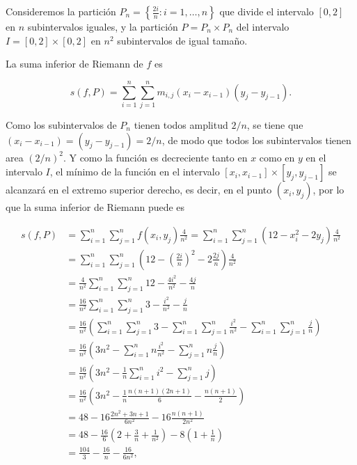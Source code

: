 \documentclass[
  a4paper,
]{scrreport}
\theoremstyle{definition}
\theoremstyle{remark}
\begin{document}
\begin{tcolorbox}[enhanced jigsaw, toprule=.15mm, coltitle=black, colframe=quarto-callout-tip-color-frame, leftrule=.75mm, breakable, left=2mm, opacitybacktitle=0.6, colbacktitle=quarto-callout-tip-color!10!white, bottomrule=.15mm, opacityback=0, title=\textcolor{quarto-callout-tip-color}{\faLightbulb}\hspace{0.5em}{Solución}, bottomtitle=1mm, toptitle=1mm, titlerule=0mm, colback=white, arc=.35mm, rightrule=.15mm]

Consideremos la partición
\(P_n = \left\{\frac{2i}{n}: i=1,\ldots,n\right\}\) que divide el
intervalo \([0,2]\) en \(n\) subintervalos iguales, y la partición
\(P=P_n\times P_n\) del intervalo \(I=[0,2]\times[0,2]\) en \(n^2\)
subintervalos de igual tamaño.

La suma inferior de Riemann de \(f\) es

\[
s(f,P) = \sum_{i=1}^n\sum_{j=1}^n m_{i,j} (x_i-x_{i-1})(y_j-y_{j-1}).
\]

Como los subintervalos de \(P_n\) tienen todos amplitud \(2/n\), se
tiene que \((x_i-x_{i-1}) = (y_j-y_{j-1}) = 2/n\), de modo que todos los
subintervalos tienen area \((2/n)^2\). Y como la función es decreciente
tanto en \(x\) como en \(y\) en el intervalo \(I\), el mínimo de la
función en el intervalo \([x_i,x_{i-1}]\times[y_j,y_{j-1}]\) se
alcanzará en el extremo superior derecho, es decir, en el punto
\((x_i,y_j)\), por lo que la suma inferior de Riemann puede es

\begin{align*}
s(f,P) 
&= \sum_{i=1}^n\sum_{j=1}^n f(x_i,y_j) \frac{4}{n^2}
= \sum_{i=1}^n\sum_{j=1}^n (12-x_i^2-2y_j) \frac{4}{n^2} \\
&= \sum_{i=1}^n\sum_{j=1}^n \left(12-\left(\frac{2i}{n}\right)^2-2\frac{2j}{n}\right) \frac{4}{n^2} \\
&= \frac{4}{n^2} \sum_{i=1}^n\sum_{j=1}^n 12-\frac{4i^2}{n^2}-\frac{4j}{n} \\
&= \frac{16}{n^2} \sum_{i=1}^n\sum_{j=1}^n 3-\frac{i^2}{n^2}-\frac{j}{n} \\
&= \frac{16}{n^2} \left(\sum_{i=1}^n\sum_{j=1}^n 3- \sum_{i=1}^n\sum_{j=1}^n \frac{i^2}{n^2}- \sum_{i=1}^n\sum_{j=1}^n \frac{j}{n}\right) \\
&= \frac{16}{n^2} \left(3n^2 - \sum_{i=1}^n n\frac{i^2}{n^2} - \sum_{j=1}^n n\frac{j}{n}\right) \\
&= \frac{16}{n^2} \left(3n^2 - \frac{1}{n}\sum_{i=1}^n i^2 - \sum_{j=1}^n j\right) \\
&= \frac{16}{n^2} \left(3n^2 - \frac{1}{n}\frac{n(n+1)(2n+1)}{6} - \frac{n(n+1)}{2}\right) \\
&= 48 - 16\frac{2n^2+3n+1}{6n^2} - 16\frac{n(n+1)}{2n^2} \\
&= 48 - \frac{16}{6}\left(2 +\frac{3}{n}+\frac{1}{n^2}\right) - 8\left(1+\frac{1}{n}\right) \\
&= \frac{104}{3} -\frac{16}{n} -\frac{16}{6n^2},
\end{align*}


\end{tcolorbox}
\end{document}
